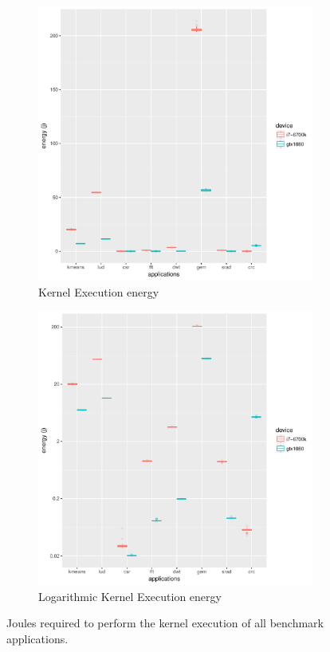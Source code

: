 \documentclass[../document.tex]{subfiles}
\begin{document}
\label{ssec:energy}

\begin{figure}
\begin{subfigure}[htb]{.45\textwidth}
\centering
\includegraphics[width=1\textwidth]{figures/energy-results/energy_charts.pdf}
\caption{Kernel Execution energy}
\label{fig:energy}
\end{subfigure}
\hfill
\begin{subfigure}[htb]{.45\textwidth}
\centering
\includegraphics[width=1\textwidth]{figures/energy-results/energy_charts_log10.pdf}
\caption{Logarithmic Kernel Execution energy}
\label{fig:energy-log}
\end{subfigure}
\caption{Joules required to perform the kernel execution of all benchmark applications.}
\end{figure}
\end{document}
